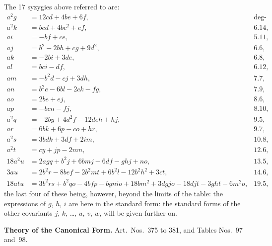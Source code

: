 \documentclass[11pt,a4paper]{book}
\begin{document}
The 17 syzygies above referred to are:
\begin{align*}
a^2 g &= 12cd + 4be + 6f, & \text{deg-ord.\ 6.10,}\\
a^2 k &= bcd + 4bc^2 + ef, & \text{6.14,}\\
ai &= -bf + ce, & \text{5.11,}\\
aj &= b^2 - 2bh + cg + 9d^2, & \text{6.6,}\\
ak &= -2bi + 3de, & \text{6.8,}\\
al &=bci - df, & \text{6.12,}\\
am &= -b^2 d - cj + 3dh, & \text{7.7,}\\
an &= b^2 e - 6bl - 2ck - fg, & \text{7.9,}\\
ao &= 2be + ej, & \text{8.6,}\\
ap &= -bcn - fj, & \text{8.10,}\\
a^2 q &= -2by + 4d^2 f - 12deh + hj, & \text{9.5,}\\
ar &= 6bk + 6p - co + hr, & \text{9.7,}\\
a^2 s &= 3bdk + 3df + 2im, & \text{10.8,}\\
a^2 t &= cy + jp - 2mn, & \text{12.6,}\\
18a^2 u &= 2agq + b^2 j + 6bmj - 6df - ghj + no, & \text{13.5,}\\
3au &= 2b^2 r - 8bef - 2b^2 mt + 6b^2 l - 12b^2 h^2 + 3ct, & \text{14.6,}\\
18atu &= 3b^2 rs + b^2 qo - 4bfp - bgnio + 18bm^2 + 3dgjo - 18djt - 3ght - 6m^2 o, & \text{19.5,}
\end{align*}
the last four of these being, however, beyond the limits of the table: the expressions of $g$, $h$, $i$ are here in the standard form: the standard forms of the other covariants $j$, $k$, \ldots, $u$, $v$, $w$, will be given further on.

\newpage
\noindent\textbf{Theory of the Canonical Form.} Art.\ Nos.\ 375 to 381, and Tables Nos.~97 and~98.

\medskip
\end{document}
